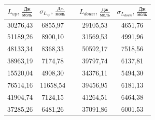 \documentclass[11pt]{article}
\begin{document}
\begin{table}[H]
\centering
\begin{tabular}{|c|c|c|c|c|}
\hline
$L_{up}\text{, } \frac{\text{Дж}}{\text{моль}}$ & $\sigma_{L_{up}}\text{, } \frac{\text{Дж}}{\text{моль}}$ &  & $L_{down}\text{, } \frac{\text{Дж}}{\text{моль}}$ & $\sigma_{L_{down}}\text{, } \frac{\text{Дж}}{\text{моль}}$ \\ \hline
30276,43                                        & 6855,97                                                  &  & 29105,53                                          & 4651,76                                                    \\ \hline
51189,26                                        & 8900,10                                                  &  & 31569,53                                          & 4991,96                                                    \\ \hline
48133,34                                        & 8368,33                                                  &  & 50592,17                                          & 7518,56                                                    \\ \hline
38963,19                                        & 7174,78                                                  &  & 39797,74                                          & 6137,81                                                    \\ \hline
15520,04                                        & 4908,30                                                  &  & 34376,11                                          & 5494,30                                                    \\ \hline
76514,16                                        & 11658,54                                                 &  & 39456,95                                          & 6181,13                                                    \\ \hline
41904,74                                        & 7124,15                                                  &  & 41264,51                                          & 6464,38                                                    \\ \hline
37285,26                                        & 6481,26                                                  &  & 37091,86                                          & 6001,53                                                    \\ \hline

\end{tabular}
\end{table}
\end{document}
